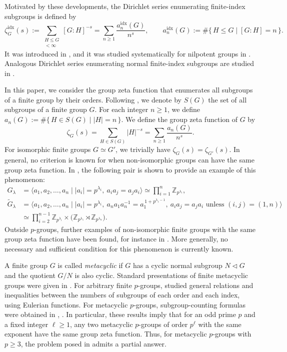 \documentclass[onecolumn]{article}
\numberwithin{equation}{section}
\theoremstyle{mytheoremstyle}
\begin{document}
Motivated by these developments, the Dirichlet series enumerating finite-index subgroups is defined by
\[
  \zeta^{\mathrm{idx}}_{G}(s)
    :=\sum_{\substack{H\le G\\ [G:H]<\infty}} [G:H]^{-s}
    =\sum_{n\ge 1}\frac{a^{\mathrm{idx}}_{n}(G)}{n^{s}},
  \qquad
  a^{\mathrm{idx}}_{n}(G):=\#\{\,H\le G\mid [G:H]=n\,\}.
\]
It was introduced in \cite{Smith1983}, and it was studied systematically for nilpotent groups in \cite{GSS1988}. Analogous Dirichlet series enumerating normal finite-index subgroups are studied in \cite{Lee2022}.

In this paper, we consider the group zeta function that enumerates all subgroups of a finite group by their orders.
Following \cite{Hironaka2017}, we denote by $S(G)$ the set of all subgroups of a finite group $G$.
For each integer $n\ge 1$, we define $a_n(G):=\#\{\,H\in S(G)\mid |H|=n\,\}$.
We define the group zeta function of $G$ by
\[
  \zeta_G(s)=\sum_{H\in S(G)}|H|^{-s}
  =\sum_{n\ge 1}\frac{a_n(G)}{n^{s}}.
\]
For isomorphic finite groups $G\simeq G'$, we trivially have $\zeta_G(s)=\zeta_{G'}(s)$.
In general, no criterion is known for when non-isomorphic groups can have the same group zeta function.
In \cite{Hironaka2017}, the following pair is shown to provide an example of this phenomenon:
\begin{align*}
G_\lambda
  &= \langle a_1,a_2,\dots,a_n \mid |a_i| = p^{\lambda_i},\ a_i a_j = a_j a_i \rangle
     \simeq \prod_{i=1}^{n} \mathbb{Z}_{p^{\lambda_i}},\\
\widetilde{G}_\lambda
  &= \langle a_1,a_2,\dots,a_n \mid |a_i| = p^{\lambda_i},\
       a_n a_1 a_n^{-1} = a_1^{\,1+p^{\lambda_1-1}},\
       a_i a_j = a_j a_i \text{ unless } (i,j)=(1,n) \rangle
  \nonumber\\
  &\simeq \prod_{i=2}^{n-1} \mathbb{Z}_{p^{\lambda_i}}
        \times \bigl(\mathbb{Z}_{p^{\lambda_1}}\rtimes
                      \mathbb{Z}_{p^{\lambda_n}}\bigr).
\end{align*}
Outside $p$-groups, further examples of non-isomorphic finite groups with the same group zeta function
have been found, for instance in \cite{ParkerKanchana2014}.
More generally, no necessary and sufficient condition for this phenomenon is currently known.

A finite group $G$ is called \emph{metacyclic} if $G$ has a cyclic normal subgroup
$N\lhd G$ and the quotient $G/N$ is also cyclic.
Standard presentations of finite metacyclic groups were given in \cite{Hempel2000}.
For arbitrary finite $p$-groups, \cite{Wall1961} studied general relations and inequalities
between the numbers of subgroups of each order and each index, using Eulerian functions.
For metacyclic $p$-groups, subgroup-counting formulas were obtained in \cite{Berkovich2011}, \cite{Mann2010}.
In particular, these results imply that for an odd prime $p$ and a fixed integer $\ell\ge 1$,
any two metacyclic $p$-groups of order $p^{\ell}$ with the same exponent have the same group zeta function.
Thus, for metacyclic $p$-groups with $p\ge 3$, the problem posed in \cite{Hironaka2017}
admits a partial answer.
\end{document}
